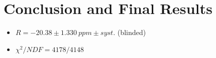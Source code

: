 \chapter{Conclusion and Final Results}
\label{Ch:Conclusion}

\begin{itemize}
	\item{$R = -20.38 \pm \SI{1.330}{ppm} \pm syst.$ (blinded)}
	\item{$\chi^{2}/NDF = 4178/4148$}
\end{itemize}
